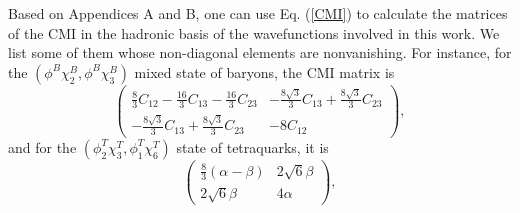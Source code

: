 \documentclass[12pt,prd,onecolumn,floatfix,nofootinbib]{revtex4}
\begin{document}
\label{AppendixC} \setcounter{equation}{0} \renewcommand{\theequation}{C%
\arabic{equation}} Based on Appendices A and B, one can use Eq. (\ref{CMI})
to calculate the matrices of the CMI in the hadronic basis of the
wavefunctions involved in this work. We list some of them whose non-diagonal
elements are nonvanishing. For instance, for the $(\phi ^{B}\chi
_{2}^{B},\phi ^{B}\chi _{3}^{B})$ mixed state of baryons, the CMI matrix is
\begin{equation}
\begin{pmatrix}
\frac{8}{3}C_{12}-\frac{16}{3}C_{13}-\frac{16}{3}C_{23} & -\frac{8\sqrt{3}}{3%
}C_{13}+\frac{8\sqrt{3}}{3}C_{23} \\
-\frac{8\sqrt{3}}{3}C_{13}+\frac{8\sqrt{3}}{3}C_{23} & -8C_{12}%
\end{pmatrix}%
,  \label{mixing23}
\end{equation}
and for the $(\phi _{2}^{T}\chi _{3}^{T},\phi _{1}^{T}\chi _{6}^{T})$ state
of tetraquarks, it is
\begin{equation}
\begin{pmatrix}
\frac{8}{3}(\alpha -\beta ) & 2\sqrt{6}\beta \\
2\sqrt{6}\beta & 4\alpha%
\end{pmatrix}%
,  \label{21mixing36}
\end{equation}
\end{document}
